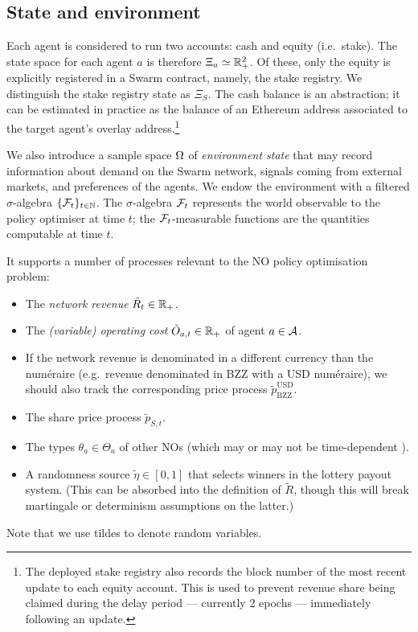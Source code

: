 \subsection{State and environment}
\label{section:state}

Each agent is considered to run two accounts: cash and equity (i.e.~stake).
%
The state space for each agent $a$ is therefore $\Xi_a\simeq\mathbb{R}_+^2$.
%
Of these, only the equity is explicitly registered in a Swarm contract, namely, the stake registry.
%
We distinguish the stake registry state as $\Xi_S$.
%
The cash balance is an abstraction; it can be estimated in practice as the balance of an Ethereum address associated to the target agent's overlay address.\footnote{The deployed stake registry also records the block number of the most recent update to each equity account. This is used to prevent revenue share being claimed during the delay period --- currently 2 epochs --- immediately following an update.}

We also introduce a sample space $\Omega$ of \emph{environment state} that may record information about demand on the Swarm network, signals coming from external markets, and preferences of the agents.
%
We endow the environment with a filtered $\sigma$-algebra $\{\mathcal{F}_t\}_{t\in\mathbb{N}}$.
%
The $\sigma$-algebra $\mathcal{F}_t$ represents the world observable to the policy optimiser at time $t$; the $\mathcal{F}_t$-measurable functions are the quantities computable at time $t$.

It supports a number of processes relevant to the NO policy optimisation problem:
\begin{itemize}
  \item The \emph{network revenue} $\tilde{R}_t\in \mathbb{R}_+$.
  \item The \emph{(variable) operating cost} $\tilde{O}_{a,t}\in\mathbb{R}_+$ of agent $a\in\mathcal{A}$.
  \item If the network revenue is denominated in a different currency than the num\'eraire (e.g.~revenue denominated in BZZ with a USD num\'eraire), we should also track the corresponding price process $\tilde p_\mathrm{BZZ}^\mathrm{USD}$.
  \item The share price process $\tilde{p}_{S,t}$.
  \item The types $\theta_a\in\Theta_a$ of other NOs (which may or may not be time-dependent \cite{bergemann2019dynamic}).
  \item 
    A randomness source $\tilde \eta \in [0,1]$ that selects winners in the lottery payout system. (This can be absorbed into the definition of $\tilde{R}$, though this will break martingale or determinism assumptions on the latter.)
\end{itemize}
%
Note that we use tildes to denote random variables.

